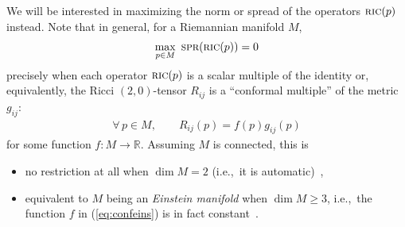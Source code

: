 \documentclass[10pt,a4paper]{amsart}
\numberwithin{equation}{section}
\newcommand{\cat}[1]{\textsc{#1}}
\begin{document}
We will be interested in maximizing the norm or spread of the operators $\cat{ric}(p)$ instead. Note that in general, for a Riemannian manifold $M$,
\begin{gather*}%
\max_{p\in M}~\cat{spr}(\cat{ric}(p))=0
\end{gather*}
precisely when each operator $\cat{ric}(p)$ is a scalar multiple of the identity or, equivalently, the Ricci $(2,0)$-tensor $R_{ij}$ is a ``conformal multiple'' of the metric $g_{ij}$:
\begin{gather}\label{eq:confeins}
 \forall\, p\in M,\qquad R_{ij}(p) = f(p) g_{ij}(p)
\end{gather}
for some function $f\colon M\to \mathbb{R}$. Assuming $M$ is connected, this is
\begin{itemize}\itemsep=0pt
\item no restriction at all when $\dim M=2$ (i.e.,~it is automatic)~\cite[Remark 1.96(a)]{bes},
\item equivalent to $M$ being an {\it Einstein manifold} when $\dim M \ge 3$, i.e.,~the function $f$ in (\ref{eq:confeins}) is in fact constant~\cite[Theorem~1.97]{bes}.
\end{itemize}
\end{document}
